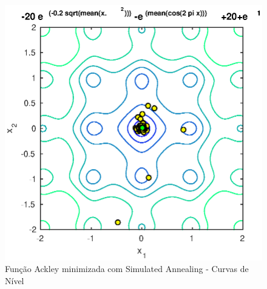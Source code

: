 \documentclass[conference,compsoc]{IEEEtran}
\begin{document}
\begin{figure}[!htcb]
\centering
\includegraphics[scale=0.65]{SA_ackley_curvNivel.eps}
\caption{Função Ackley minimizada com Simulated Annealing - Curvas de Nível}
\label{fig:SA_ackley_curvNivel}
\end{figure}
\end{document}
